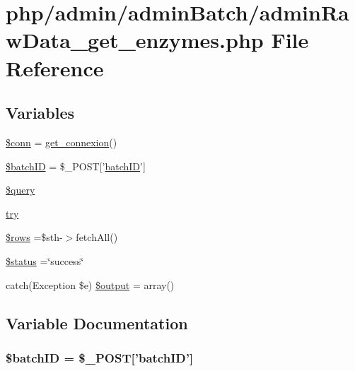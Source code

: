 \hypertarget{admin_batch_2admin_raw_data__get__enzymes_8php}{\section{php/admin/admin\-Batch/admin\-Raw\-Data\-\_\-get\-\_\-enzymes.php File Reference}
\label{admin_batch_2admin_raw_data__get__enzymes_8php}
}
\subsection*{Variables}
\begin{DoxyCompactItemize}
\item 
\hyperlink{admin_batch_2admin_raw_data__get__enzymes_8php_aa8a5a87b9c1a6a0819b88447cbe41877}{\$conn} = \hyperlink{php__functions_8php_ace18bc10f3fd08f92688ac743e0d8c2e}{get\-\_\-connexion}()
\item 
\hyperlink{admin_batch_2admin_raw_data__get__enzymes_8php_aaa6d122ea9cb55b210aadd86e5654a74}{\$batch\-I\-D} = \$\-\_\-\-P\-O\-S\-T\mbox{[}'\hyperlink{obsolete_2processing__bak_8php_a88c5bc4262b7c34f236357f5c53fc99b}{batch\-I\-D}'\mbox{]}
\item 
\hyperlink{admin_batch_2admin_raw_data__get__enzymes_8php_af59a5f7cd609e592c41dc3643efd3c98}{\$query}
\item 
\hyperlink{admin_batch_2admin_raw_data__get__enzymes_8php_abe4cc9788f52e49485473dc699537388}{try}
\item 
\hyperlink{admin_batch_2admin_raw_data__get__enzymes_8php_ace2ec39e7df3899fa8df9640ec274b03}{\$rows} =\$sth-\/$>$fetch\-All()
\item 
\hyperlink{admin_batch_2admin_raw_data__get__enzymes_8php_a58391ea75f2d29d5d708d7050b641c33}{\$status} =\char`\"{}success\char`\"{}
\item 
catch(Exception \$e) \hyperlink{admin_batch_2admin_raw_data__get__enzymes_8php_adeea971a3fd99fcce189bd638dacd58c}{\$output} = array()
\end{DoxyCompactItemize}


\subsection{Variable Documentation}
\hypertarget{admin_batch_2admin_raw_data__get__enzymes_8php_aaa6d122ea9cb55b210aadd86e5654a74}{
\subsubsection[{\$batch\-I\-D}]{\setlength{\rightskip}{0pt plus 5cm}\${\bf batch\-I\-D} = \$\-\_\-\-P\-O\-S\-T\mbox{[}'{\bf batch\-I\-D}'\mbox{]}}}\label{admin_batch_2admin_raw_data__get__enzymes_8php_aaa6d122ea9cb55b210aadd86e5654a74}


